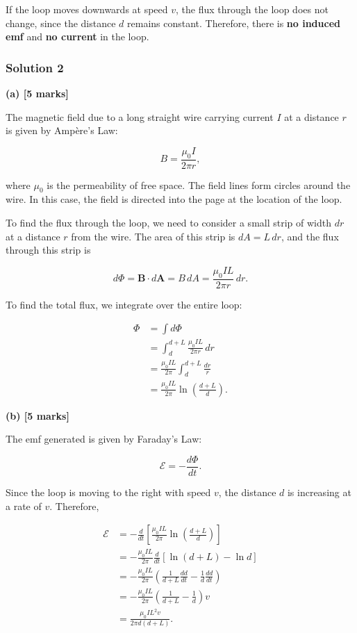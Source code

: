 \documentclass{article}
\begin{document}
If the loop moves downwards at speed $v$, the flux through the loop does not change, since the distance $d$ remains constant. Therefore, there is \textbf{no induced emf} and \textbf{no current} in the loop.

\subsubsection{Solution 2}
\textbf{(a) [5 marks]}

The magnetic field due to a long straight wire carrying current $I$ at a distance $r$ is given by Ampère's Law:

\begin{equation*}
B = \frac{\mu_0 I}{2 \pi r},
\end{equation*}

where $\mu_0$ is the permeability of free space.  The field lines form circles around the wire.  In this case, the field is directed into the page at the location of the loop.

To find the flux through the loop, we need to consider a small strip of width $dr$ at a distance $r$ from the wire.  The area of this strip is $dA = L \, dr$, and the flux through this strip is

\begin{equation*}
d\Phi = \mathbf{B} \cdot d\mathbf{A} = B \, dA = \frac{\mu_0 I L}{2 \pi r} \, dr.
\end{equation*}

To find the total flux, we integrate over the entire loop:

\begin{align*}
\Phi &= \int d\Phi \\
&= \int_d^{d + L} \frac{\mu_0 I L}{2 \pi r} \, dr \\
&= \frac{\mu_0 I L}{2 \pi} \int_d^{d + L} \frac{dr}{r} \\
&= \frac{\mu_0 I L}{2 \pi} \ln \left( \frac{d + L}{d} \right).
\end{align*}

\textbf{(b) [5 marks]}

The emf generated is given by Faraday's Law:

\begin{equation*}
\mathcal{E} = -\frac{d\Phi}{dt}.
\end{equation*}

Since the loop is moving to the right with speed $v$, the distance $d$ is increasing at a rate of $v$.  Therefore,

\begin{align*}
\mathcal{E} &= -\frac{d}{dt} \left[ \frac{\mu_0 I L}{2 \pi} \ln \left( \frac{d + L}{d} \right) \right] \\
&= -\frac{\mu_0 I L}{2 \pi} \frac{d}{dt} \left[ \ln (d + L) - \ln d \right] \\
&= -\frac{\mu_0 I L}{2 \pi} \left( \frac{1}{d + L} \frac{dd}{dt} - \frac{1}{d} \frac{dd}{dt} \right) \\
&= -\frac{\mu_0 I L}{2 \pi} \left( \frac{1}{d + L} - \frac{1}{d} \right) v \\
&= \frac{\mu_0 I L^2 v}{2 \pi d (d + L)}.
\end{align*}
\end{document}
